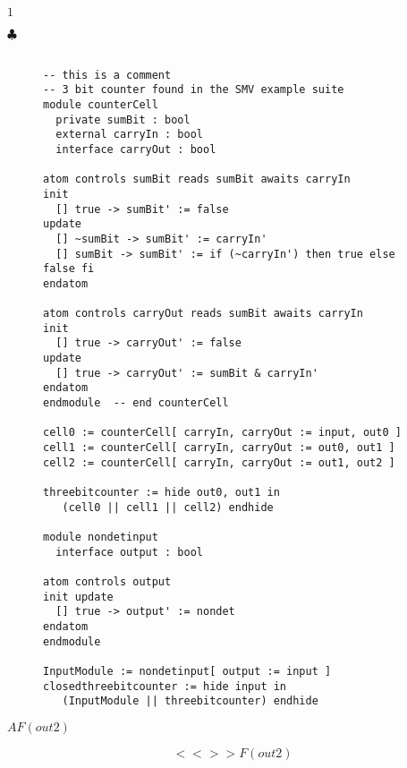{\newpage\clearpage
{}%
$1$%
\lthtmlinlinemathZ
\lthtmlcheckvsize\clearpage}

{\newpage\clearpage
{}%
$\clubsuit$%
\lthtmlinlinemathZ
\lthtmlcheckvsize\clearpage}

{\newpage\clearpage
{}%
\begin{figure}\begin{verbatim}

-- this is a comment
-- 3 bit counter found in the SMV example suite 
module counterCell
  private sumBit : bool
  external carryIn : bool
  interface carryOut : bool

atom controls sumBit reads sumBit awaits carryIn 
init
  [] true -> sumBit' := false
update
  [] ~sumBit -> sumBit' := carryIn'
  [] sumBit -> sumBit' := if (~carryIn') then true else false fi
endatom

atom controls carryOut reads sumBit awaits carryIn
init
  [] true -> carryOut' := false
update
  [] true -> carryOut' := sumBit & carryIn'
endatom
endmodule  -- end counterCell

cell0 := counterCell[ carryIn, carryOut := input, out0 ]
cell1 := counterCell[ carryIn, carryOut := out0, out1 ]
cell2 := counterCell[ carryIn, carryOut := out1, out2 ]

threebitcounter := hide out0, out1 in
   (cell0 || cell1 || cell2) endhide

module nondetinput
  interface output : bool

atom controls output
init update
  [] true -> output' := nondet
endatom 
endmodule 

InputModule := nondetinput[ output := input ]
closedthreebitcounter := hide input in
   (InputModule || threebitcounter) endhide\end{verbatim}
\end{figure}%
\lthtmlfigureZ
\lthtmlcheckvsize\clearpage}

{\newpage\clearpage
{}%
$A F (out2)$%
\lthtmlinlinemathZ
\lthtmlcheckvsize\clearpage}

{\newpage\clearpage
{}%
\begin{displaymath}<< >> F (out2) \end{displaymath}%
\lthtmldisplayZ
\lthtmlcheckvsize\clearpage}

